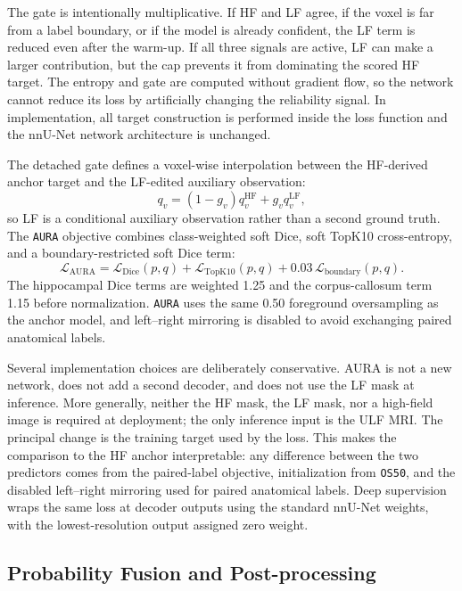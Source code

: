 \documentclass[runningheads]{llncs}
\newcommand{\osfifty}{\texttt{OS50}}
\newcommand{\aura}{\texttt{AURA}}
\begin{document}
The gate is intentionally multiplicative. If HF and LF agree, if the voxel is far from a label boundary, or if the model is already confident, the LF term is reduced even after the warm-up. If all three signals are active, LF can make a larger contribution, but the cap prevents it from dominating the scored HF target. The entropy and gate are computed without gradient flow, so the network cannot reduce its loss by artificially changing the reliability signal. In implementation, all target construction is performed inside the loss function and the nnU-Net network architecture is unchanged.

The detached gate defines a voxel-wise interpolation between the HF-derived anchor target and the LF-edited auxiliary observation:
\begin{equation}
q_v=(1-g_v)q^{\mathrm{HF}}_v+g_v q^{\mathrm{LF}}_v,
\label{eq:soft-target}
\end{equation}
so LF is a conditional auxiliary observation rather than a second ground truth. The \aura{} objective combines class-weighted soft Dice, soft TopK10 cross-entropy, and a boundary-restricted soft Dice term:
\begin{equation}
\mathcal{L}_{\mathrm{AURA}} =
\mathcal{L}_{\mathrm{Dice}}(p,q)
+
\mathcal{L}_{\mathrm{TopK10}}(p,q)
+
0.03\,\mathcal{L}_{\mathrm{boundary}}(p,q).
\label{eq:aura-loss}
\end{equation}
The hippocampal Dice terms are weighted 1.25 and the corpus-callosum term 1.15 before normalization. \aura{} uses the same 0.50 foreground oversampling as the anchor model, and left--right mirroring is disabled to avoid exchanging paired anatomical labels.

Several implementation choices are deliberately conservative. AURA is not a new network, does not add a second decoder, and does not use the LF mask at inference. More generally, neither the HF mask, the LF mask, nor a high-field image is required at deployment; the only inference input is the ULF MRI. The principal change is the training target used by the loss. This makes the comparison to the HF anchor interpretable: any difference between the two predictors comes from the paired-label objective, initialization from \osfifty{}, and the disabled left--right mirroring used for paired anatomical labels. Deep supervision wraps the same loss at decoder outputs using the standard nnU-Net weights, with the lowest-resolution output assigned zero weight.


\subsection{Probability Fusion and Post-processing}
\end{document}
